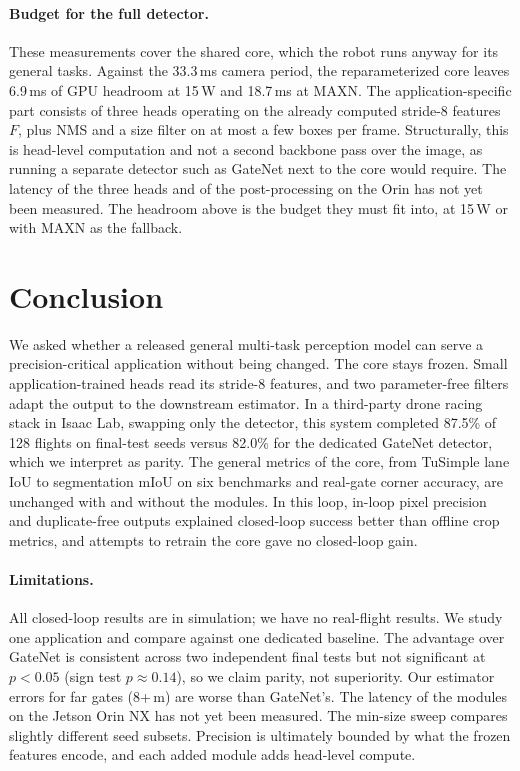 \documentclass[10pt,twocolumn,letterpaper]{article}
\begin{document}
\paragraph{Budget for the full detector.}
These measurements cover the shared core, which the robot runs anyway for its general tasks. Against the 33.3\,ms camera period, the reparameterized core leaves 6.9\,ms of GPU headroom at 15\,W and 18.7\,ms at MAXN. The application-specific part consists of three heads operating on the already computed stride-8 features $F$, plus NMS and a size filter on at most a few boxes per frame. Structurally, this is head-level computation and not a second backbone pass over the image, as running a separate detector such as GateNet next to the core would require. The latency of the three heads and of the post-processing on the Orin has not yet been measured. The headroom above is the budget they must fit into, at 15\,W or with MAXN as the fallback.

\section{Conclusion}
\label{sec:conclusion}
We asked whether a released general multi-task perception model can serve a precision-critical application without being changed. The core stays frozen. Small application-trained heads read its stride-8 features, and two parameter-free filters adapt the output to the downstream estimator. In a third-party drone racing stack in Isaac Lab, swapping only the detector, this system completed 87.5\% of 128 flights on final-test seeds versus 82.0\% for the dedicated GateNet detector, which we interpret as parity. The general metrics of the core, from TuSimple lane IoU to segmentation mIoU on six benchmarks and real-gate corner accuracy, are unchanged with and without the modules. In this loop, in-loop pixel precision and duplicate-free outputs explained closed-loop success better than offline crop metrics, and attempts to retrain the core gave no closed-loop gain.

\paragraph{Limitations.}
All closed-loop results are in simulation; we have no real-flight results. We study one application and compare against one dedicated baseline. The advantage over GateNet is consistent across two independent final tests but not significant at $p<0.05$ (sign test $p\approx0.14$), so we claim parity, not superiority. Our estimator errors for far gates (8+\,m) are worse than GateNet's. The latency of the modules on the Jetson Orin NX has not yet been measured. The min-size sweep compares slightly different seed subsets. Precision is ultimately bounded by what the frozen features encode, and each added module adds head-level compute.
\end{document}
